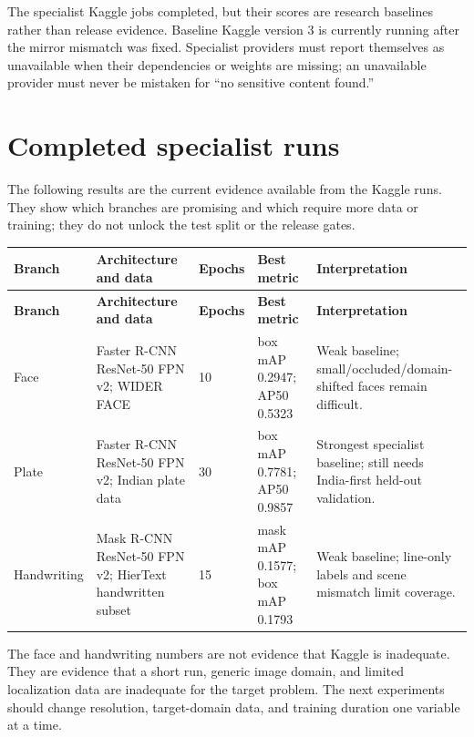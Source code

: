 \begin{warningbox}
The specialist Kaggle jobs completed, but their scores are research baselines rather than release evidence. Baseline Kaggle version 3 is currently running after the mirror mismatch was fixed. Specialist providers must report themselves as unavailable when their dependencies or weights are missing; an unavailable provider must never be mistaken for ``no sensitive content found.''
\end{warningbox}

\section{Completed specialist runs}

The following results are the current evidence available from the Kaggle runs. They show which branches are promising and which require more data or training; they do not unlock the test split or the release gates.

\begin{longtable}{@{}L{31mm}L{36mm}L{26mm}L{29mm}L{35mm}@{}}
\toprule
\textbf{Branch} & \textbf{Architecture and data} & \textbf{Epochs} & \textbf{Best metric} & \textbf{Interpretation} \\
\midrule
\endfirsthead
\toprule
\textbf{Branch} & \textbf{Architecture and data} & \textbf{Epochs} & \textbf{Best metric} & \textbf{Interpretation} \\
\midrule
\endhead
Face & Faster R-CNN ResNet-50 FPN v2; WIDER FACE & 10 & box mAP 0.2947; AP50 0.5323 & Weak baseline; small/occluded/domain-shifted faces remain difficult. \\
Plate & Faster R-CNN ResNet-50 FPN v2; Indian plate data & 30 & box mAP 0.7781; AP50 0.9857 & Strongest specialist baseline; still needs India-first held-out validation. \\
Handwriting & Mask R-CNN ResNet-50 FPN v2; HierText handwritten subset & 15 & mask mAP 0.1577; box mAP 0.1793 & Weak baseline; line-only labels and scene mismatch limit coverage. \\
\bottomrule
\end{longtable}

The face and handwriting numbers are not evidence that Kaggle is inadequate. They are evidence that a short run, generic image domain, and limited localization data are inadequate for the target problem. The next experiments should change resolution, target-domain data, and training duration one variable at a time.
